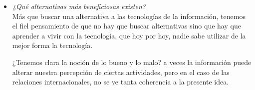\begin{itemize}
	\item \emph{¿Qué alternativas más beneficiosas existen?}\\
		Más que buscar una alternativa a las tecnologías de la información, tenemos el fiel pensamiento de que
		no hay que buscar alternativas sino que hay que aprender a vivir con la tecnología, que hoy por hoy,
		nadie sabe utilizar de la mejor forma la tecnología.

		¿Tenemos clara la noción de lo bueno y lo malo? a veces la información puede alterar nuestra percepción
		de ciertas actividades, pero en el caso de las relaciones internacionales, no se ve tanta coherencia
		a la presente idea.
\end{itemize}
